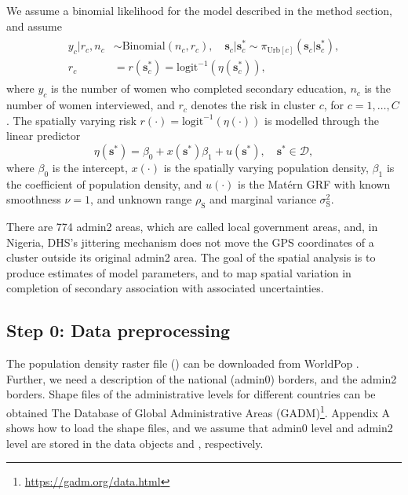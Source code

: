 We assume a binomial likelihood for the model described in the method section, and assume
\begin{align}
\label{eqn:NigeriaModel}
\begin{split}
y_c | r_c,n_c &\sim \text{Binomial}(n_c, r_c), \quad \boldsymbol{s}_c|\boldsymbol{s}_c^*\sim \pi_{\mathrm{Urb}[c]}(\boldsymbol{s}_c|\boldsymbol{s}_c^*),\\
    r_c  &= r(\boldsymbol{s}_c^*) = \mathrm{logit}^{-1}( \eta(\boldsymbol{s}_c^*)),
\end{split}
\end{align}
where $y_c$ is the number of women who completed secondary education, $n_c$ is the number of women interviewed, and $r_c$ denotes the risk in cluster $c$, for $c = 1, \ldots, C$. The spatially varying risk $r(\cdot) = \mathrm{logit}^{-1}(\eta(\cdot))$ is  modelled through the linear predictor 
\[
\eta(\boldsymbol{s}^*) = \beta_0 +x(\boldsymbol{s}^*)\beta_1 + u(\boldsymbol{s}^*), \quad \boldsymbol{s}^*\in\mathcal{D},
\]
where $\beta_0$ is the intercept, $x(\cdot)$ is the spatially varying population density, $\beta_1$ is the coefficient of population density, and $u(\cdot)$ is the Matérn GRF with known smoothness $\nu = 1$, and unknown range $\rho_\mathrm{S}$ and marginal variance $\sigma_\mathrm{S}^2$.

There are 774 admin2 areas, which are called local government areas, and, in Nigeria, DHS's jittering mechanism does not move the GPS coordinates of a cluster outside its original admin2 area.
The goal of the spatial analysis is to produce estimates of model parameters, and to map spatial variation in completion of secondary association with associated uncertainties.

\subsection{Step 0: Data preprocessing}
The population density raster file () can be downloaded from WorldPop \citep{pop}. Further, we need a description of the national (admin0) borders, and the admin2 borders. Shape files of the administrative levels for different countries can be obtained The Database of Global Administrative Areas (GADM)\footnote{\url{https://gadm.org/data.html}}. Appendix A shows how to load the shape files, and we assume that admin0 level and admin2 level are stored in the data objects  and , respectively.

